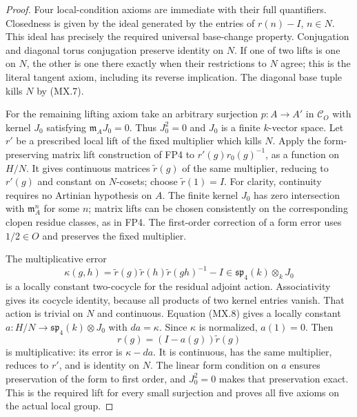 \begin{proof}
Four local-condition axioms are immediate with their full
quantifiers.  Closedness is given by the ideal generated by
the entries of $r(n)-I$, $n\in N$.  This ideal has precisely
the required universal base-change property.  Conjugation
and diagonal torus conjugation preserve identity on $N$.
If one of two lifts is one on $N$, the other is one there
exactly when their restrictions to $N$ agree; this is the
literal tangent axiom, including its reverse implication.
The diagonal base tuple kills $N$ by (MX.7).

For the remaining lifting axiom take an arbitrary surjection
$p:A\to A'$ in $\mathcal C_O$ with kernel $J_0$ satisfying
$\mathfrak m_AJ_0=0$.  Thus $J_0^2=0$ and $J_0$ is a finite
$k$-vector space.  Let $r'$ be a prescribed local lift of
the fixed multiplier which kills $N$.
Apply the form-preserving matrix lift construction of FP4 to
$r'(g)r_0(g)^{-1}$, as a function on $H/N$.
It gives continuous matrices $\widetilde r(g)$ of the same
multiplier, reducing to $r'(g)$ and constant on $N$-cosets;
choose $\widetilde r(1)=I$.
For clarity, continuity requires no Artinian hypothesis on
$A$.  The finite kernel $J_0$ has zero intersection with
$\mathfrak m_A^n$ for some $n$; matrix lifts can be chosen
consistently on the corresponding clopen residue classes,
as in FP4.  The first-order correction of a form error uses
$1/2\in O$ and preserves the fixed multiplier.

The multiplicative error
\[
 \kappa(g,h)=\widetilde r(g)\widetilde r(h)
                      \widetilde r(gh)^{-1}-I
       \in\mathfrak {sp}_4(k)\otimes_kJ_0
 \tag{MX.9}
\]
is a locally constant two-cocycle for the residual adjoint
action.  Associativity gives its cocycle identity, because
all products of two kernel entries vanish.  That action is
trivial on $N$ and continuous.  Equation (MX.8) gives a
locally constant $a:H/N\to\mathfrak {sp}_4(k)\otimes J_0$
with $da=\kappa$.  Since $\kappa$ is normalized, $a(1)=0$.
Then
\[
                   r(g)=(I-a(g))\widetilde r(g)
 \tag{MX.10}
\]
is multiplicative: its error is $\kappa-da$.
It is continuous, has the same multiplier, reduces to $r'$,
and is identity on $N$.  The linear form condition on $a$
ensures preservation of the form to first order, and
$J_0^2=0$ makes that preservation exact.  This is the
required lift for every small surjection and proves all five
axioms on the actual local group.
\end{proof}

